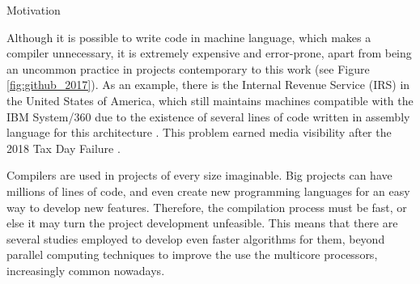 \begin{section}{Motivation}

Although it is possible to write code in machine language, which makes a compiler
unnecessary, it is extremely expensive and error-prone, apart from being an
uncommon practice in projects contemporary to this work \citep{githuboctoverse}
(see Figure \ref{fig:github_2017}). As an example, there is the Internal Revenue
Service (IRS) in the United States of America, which still maintains machines
compatible with the IBM System/360 due to the existence of several lines of
code written in assembly language for this architecture \citep{gao}.  This
problem earned media visibility after the  2018 Tax Day Failure
\citep{tax_failure}.


Compilers are used in projects of every size imaginable. Big projects can have
millions of lines of code, and even create new programming languages for an
easy way to develop new features. Therefore, the compilation process must be
fast, or else it may turn the project development unfeasible.  This means that
there are several studies employed to develop even faster algorithms for them,
beyond parallel computing techniques to improve the use the multicore processors,
increasingly common nowadays.


\end{section}
